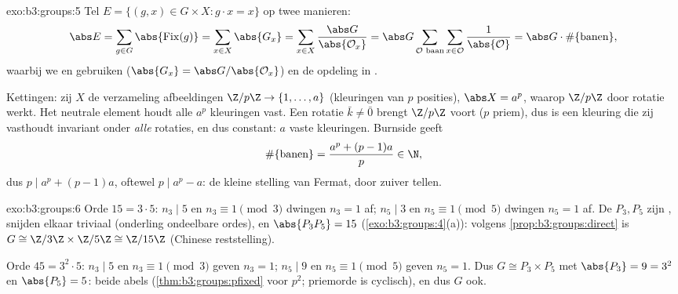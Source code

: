 \begin{solution}{exo:b3:groups:5}
Tel $E = \{(g,x) \in G \times X : g \cdot x = x\}$ op twee
manieren:
\[
\abs E = \sum_{g \in G} \abs{\operatorname{Fix}(g)}
= \sum_{x \in X} \abs{G_x}
= \sum_{x \in X} \frac{\abs G}{\abs{\mathcal O_x}}
= \abs G \sum_{\mathcal O \text{ baan}} \sum_{x \in \mathcal O}
\frac{1}{\abs{\mathcal O}}
= \abs G \cdot \#\{\text{banen}\},
\]
waarbij we  en  gebruiken ($\abs{G_x} = \abs
G/\abs{\mathcal O_x}$) en de opdeling in .

Kettingen: zij $X$ de verzameling afbeeldingen $\Z/p\Z \to \{1,
\dots, a\}$ (kleuringen van $p$ posities), $\abs X = a^p$, waarop
$\Z/p\Z$ door rotatie werkt. Het neutrale element houdt alle $a^p$
kleuringen vast. Een rotatie $\bar k \neq \bar 0$ brengt $\Z/p\Z$
voort ($p$ priem), dus is een kleuring die zij vasthoudt invariant
onder \emph{alle} rotaties, en dus constant: $a$ vaste kleuringen.
Burnside geeft
\[
\#\{\text{banen}\} = \frac{a^p + (p-1)a}{p} \in \N ,
\]
dus $p \mid a^p + (p-1)a$, oftewel $p \mid a^p - a$: de kleine
stelling van Fermat, door zuiver tellen.
\end{solution}

\begin{solution}{exo:b3:groups:6}
Orde $15 = 3 \cdot 5$: $n_3 \mid 5$ en $n_3 \equiv 1 \pmod 3$
dwingen $n_3 = 1$ af; $n_5 \mid 3$ en $n_5 \equiv 1 \pmod 5$
dwingen $n_5 = 1$ af. De  $P_3, P_5$ zijn ,
snijden elkaar triviaal (onderling ondeelbare ordes), en
$\abs{P_3P_5} = 15$ (\cref{exo:b3:groups:4}(a)): volgens
\cref{prop:b3:groups:direct} is $G \cong \Z/3\Z \times \Z/5\Z \cong
\Z/15\Z$ (Chinese reststelling).

Orde $45 = 3^2 \cdot 5$: $n_3 \mid 5$ en $n_3 \equiv 1 \pmod 3$
geven $n_3 = 1$; $n_5 \mid 9$ en $n_5 \equiv 1 \pmod 5$ geven $n_5
= 1$. Dus $G \cong P_3 \times P_5$ met $\abs{P_3} = 9 = 3^2$ en
$\abs{P_5} = 5$: beide abels (\cref{thm:b3:groups:pfixed} voor
$p^2$; priemorde is cyclisch), en dus $G$ ook.
\end{solution}

